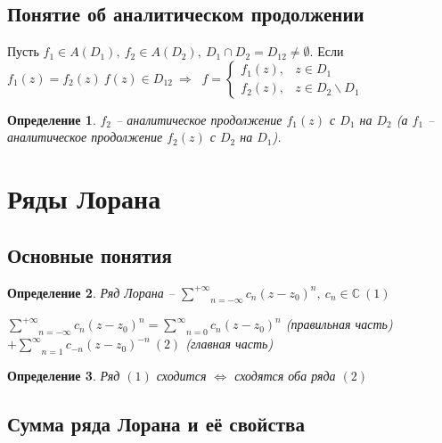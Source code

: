 \documentclass[draft]{article}
\newcommand{\then}{\ \Rightarrow\ }
\renewcommand{\C}{\mathbb{C}}
\newcommand{\msum}[2]{\underset{#1}{\overset{#2}{\sum}}}
\newcommand{\rsum}{\msum{n=1}{\infty}}
\newcommand{\ssum}{\msum{n=0}{\infty}}
\newcommand{\lsum}{\msum{n=-\infty}{+\infty}}
\newcommand{\LRA}{\Leftrightarrow}
\newcommand{\sys}[1]{\left\{\begin{matrix}#1\end{matrix}\right.}
\newcommand{\opr}[1]{\begin{opred}#1\end{opred}}
\newtheorem*{opred}{Определение}
\theoremstyle{remark}
\begin{document}
\subsection{Понятие об аналитическом продолжении}

Пусть $f_1\in A(D_1),\ f_2\in A(D_2),\ D_1\cap D_2=D_{12}\neq\emptyset$. Если $f_1(z)=f_2(z)\ f(z)\in D_{12}\then$
$f=\sys{f_1(z),&z\in D_1 \\ f_2(z),&z\in D_2\smallsetminus D_1}$

\opr{$f_2$ -- аналитическое продолжение $f_1(z)$ с $D_1$ на $D_2$ (а $f_1$ -- аналитическое продолжение $f_2(z)$ с $D_2$ на $D_1$).}


\newpage

\section{Ряды Лорана}

\subsection{Основные понятия}

\opr{Ряд Лорана -- $\lsum c_n(z-z_0)^n,\ c_n\in\C\ (1)$

$\lsum c_n(z-z_0)^n=\ssum c_n(z-z_0)^n$ (правильная часть) $+\rsum c_{-n}(z-z_0)^{-n}\ (2)$ (главная часть)}

\opr{Ряд $(1)$ сходится $\LRA$ сходятся оба ряда $(2)$}

\subsection{Сумма ряда Лорана и её свойства}
\end{document}
